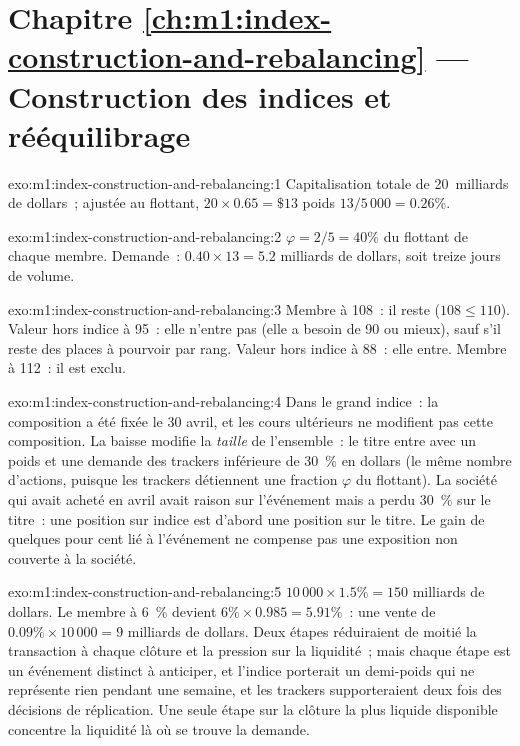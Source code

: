 \section*{Chapitre \ref{ch:m1:index-construction-and-rebalancing} --- Construction des indices et rééquilibrage}

\begin{solution}{exo:m1:index-construction-and-rebalancing:1}
Capitalisation totale de 20~milliards de dollars~; ajustée au flottant, $20 \times 0.65 = \$13$
poids $13/5\,000 = 0.26\%$.
\end{solution}

\begin{solution}{exo:m1:index-construction-and-rebalancing:2}
$\varphi = 2/5 = 40\%$ du flottant de chaque membre. Demande~: $0.40 \times 13 =
5.2$ milliards de dollars, soit treize jours de volume.
\end{solution}

\begin{solution}{exo:m1:index-construction-and-rebalancing:3}
Membre à 108~: il reste ($108 \le 110$). Valeur hors indice à 95~: elle n'entre pas (elle
a besoin de 90 ou mieux), sauf s'il reste des places à pourvoir par rang. Valeur hors indice à
88~: elle entre. Membre à 112~: il est exclu.
\end{solution}

\begin{solution}{exo:m1:index-construction-and-rebalancing:4}
Dans le grand indice~: la composition a été fixée le 30 avril, et les cours ultérieurs ne
modifient pas cette composition. La baisse modifie la \emph{taille} de l'ensemble~: le titre entre
avec un poids et une demande des trackers inférieure de 30~\% en dollars (le même nombre
d'actions, puisque les trackers détiennent une fraction $\varphi$ du flottant). La société
qui avait acheté en avril avait raison sur l'événement mais a perdu 30~\% sur le titre~: une
position sur indice est d'abord une position sur le titre. Le gain de quelques pour cent
lié à l'événement ne compense pas une exposition non couverte à la société.
\end{solution}

\begin{solution}{exo:m1:index-construction-and-rebalancing:5}
$10\,000 \times 1.5\% = 150$ milliards de dollars. Le membre à 6~\% devient $6\% \times
0.985 = 5.91\%$~: une vente de $0.09\% \times 10\,000 = 9$ milliards de dollars. Deux étapes
réduiraient de moitié la transaction à chaque clôture et la pression sur la liquidité~; mais chaque
étape est un événement distinct à anticiper, et l'indice porterait un
demi-poids qui ne représente rien pendant une semaine, et les trackers supporteraient
deux fois des décisions de réplication. Une seule étape sur la clôture la plus liquide
disponible concentre la liquidité là où se trouve la demande.
\end{solution}

